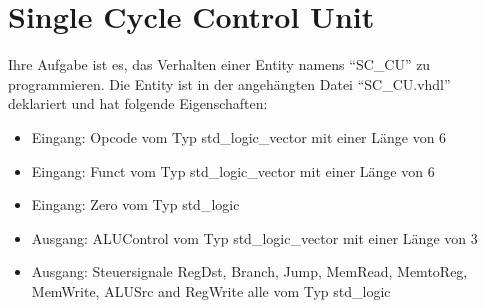 \documentclass[a4paper,12pt]{article}
\begin{document}
\pagestyle{empty}
\setlength{\parindent}{0em}
\section*{Single Cycle Control Unit}

Ihre Aufgabe ist es, das Verhalten einer Entity  namens "`SC\_CU"' zu programmieren. Die Entity ist in der angeh\"angten Datei "`SC\_CU.vhdl"' deklariert und hat folgende Eigenschaften:
\begin{itemize}
\item Eingang:  Opcode vom Typ std\_logic\_vector mit einer L\"ange von 6
\item Eingang:  Funct vom Typ std\_logic\_vector mit einer L\"ange von 6
\item Eingang:  Zero vom Typ std\_logic
\item Ausgang: ALUControl vom Typ std\_logic\_vector mit einer L\"ange von 3
\item Ausgang: Steuersignale RegDst, Branch, Jump, MemRead, MemtoReg, MemWrite, ALUSrc and RegWrite alle vom Typ std\_logic
\end{itemize}
\end{document}
